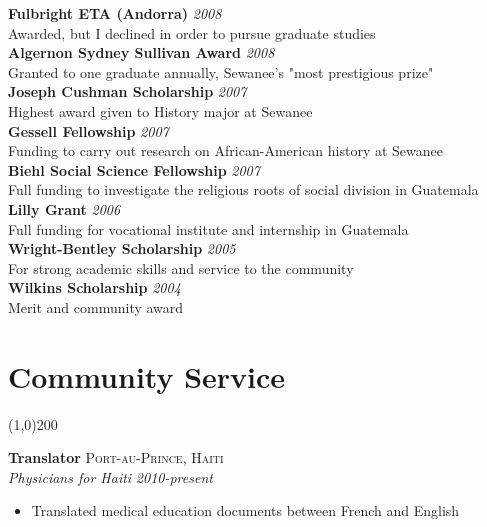 \documentclass[11pt]{article}
\begin{document}
\noindent \textbf{Fulbright ETA (Andorra)}  \hfill \emph{2008}\\
\noindent Awarded, but I declined in order to pursue graduate studies \\

\noindent \textbf{Algernon Sydney Sullivan Award}  \hfill \emph{2008}\\
\noindent Granted to one graduate annually, Sewanee's "most prestigious prize" \\

\noindent \textbf{Joseph Cushman Scholarship}  \hfill \emph{2007}\\
\noindent Highest award given to History major at Sewanee \\

\noindent \textbf{Gessell Fellowship}  \hfill \emph{2007}\\
\noindent Funding to carry out research on African-American history at Sewanee\\

\noindent \textbf{Biehl Social Science Fellowship}  \hfill \emph{2007}\\
\noindent Full funding to investigate the religious roots of social division in Guatemala\\

\noindent \textbf{Lilly Grant}  \hfill \emph{2006}\\
\noindent Full funding for vocational institute and internship in Guatemala\\

\noindent \textbf{Wright-Bentley Scholarship}  \hfill \emph{2005}\\
\noindent For strong academic skills and service to the community\\

\noindent \textbf{Wilkins Scholarship}  \hfill \emph{2004}\\
\noindent Merit and community award\\

\section*{Community Service} %
\vspace{-7mm}
\line(1,0){200}
\vspace{2mm}

\noindent \textbf{Translator} \hfill \textsc{Port-au-Prince, Haiti}\\
\noindent \emph{Physicians for Haiti} \hfill \emph{2010-present}
\vspace{-2mm}
\begin{itemize}\itemsep0pt \parskip0pt 
\item Translated medical education documents between French and English
\end{itemize}
\end{document}
